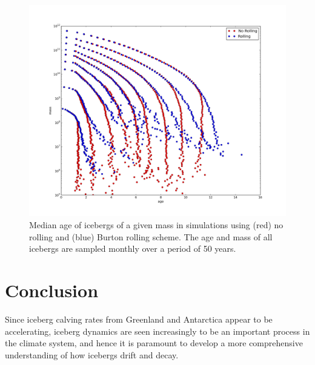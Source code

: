 \documentclass[twocol]{ametsoc_tw}
\begin{document}
\begin{figure}[!t]
 \begin{center}
 \hspace{-.5 cm} \includegraphics[width=.8\linewidth]{Figs/Berg_lifetimes}
 \caption{Median age of icebergs of a given mass in simulations using (red) no rolling and (blue) Burton rolling scheme. The age and mass of all icebergs are sampled monthly over a period of 50 years.}
 \label{fig:GCM_lifetimes}
 \end{center}
\end{figure}


\section{Conclusion} \label{sec:conc}

Since iceberg calving rates from Greenland and Antarctica appear to be accelerating, iceberg dynamics are seen increasingly to be an important process in the climate system, and hence it is paramount to develop a more comprehensive understanding of how icebergs drift and decay.





\end{document}
